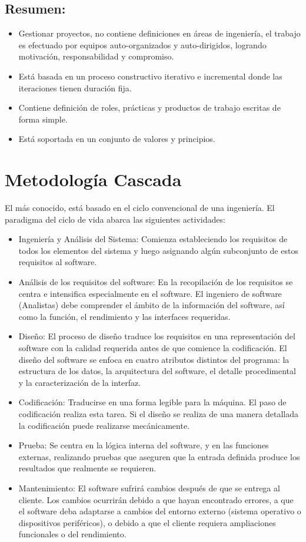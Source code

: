 \documentclass[10pt]{article}
\begin{document}
\subsection{Resumen:}
\begin{itemize}


\item Gestionar  proyectos, no contiene definiciones en áreas de ingeniería, el trabajo es efectuado por equipos auto-organizados y auto-dirigidos, logrando motivación, responsabilidad y compromiso. 
\item Está basada en un proceso constructivo iterativo e incremental donde las iteraciones tienen duración fija.
\item Contiene definición de roles, prácticas y productos de trabajo escritas de forma simple.
\item Está soportada en un conjunto de valores y principios.
\end{itemize}


\newpage
\section{Metodología Cascada}


El más conocido, está basado en el ciclo convencional de una ingeniería. El paradigma del ciclo de vida abarca las siguientes actividades:
\begin{itemize}
\item Ingeniería y Análisis del Sistema: Comienza estableciendo los requisitos de todos los elementos del sistema y luego asignando algún subconjunto de estos requisitos al software.
\item Análisis de los requisitos del software: En la recopilación de los requisitos se centra e intensifica especialmente en el software. El ingeniero de software (Analistas) debe comprender el ámbito de la información del software, así como la función, el rendimiento y las interfaces requeridas.
\item Diseño: El proceso de diseño traduce los requisitos en una representación del software con la calidad requerida antes de que comience la codificación. El diseño del software se enfoca en cuatro atributos distintos del programa: la estructura de los datos, la arquitectura del software, el detalle procedimental y la caracterización de la interfaz. 
\item Codificación: Traducirse en una forma legible para la máquina. El paso de codificación realiza esta tarea. Si el diseño se realiza de una manera detallada la codificación puede realizarse mecánicamente.
\item Prueba: Se centra en la lógica interna del software, y en las funciones externas, realizando pruebas que aseguren que la entrada definida produce los resultados que realmente se requieren.
\item Mantenimiento: El software sufrirá cambios después de que se entrega al cliente. Los cambios ocurrirán debido a que hayan encontrado errores, a que el software deba adaptarse a cambios del entorno externo (sistema operativo o dispositivos periféricos), o debido a que el cliente requiera ampliaciones funcionales o del rendimiento. 

\end{itemize}
\end{document}
